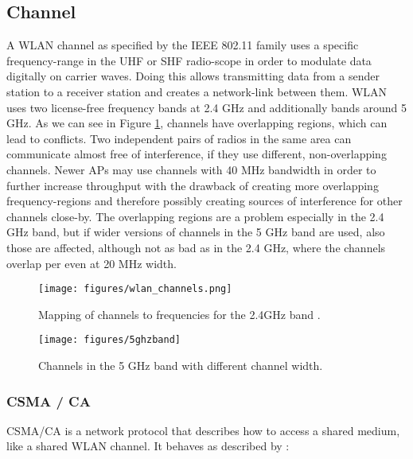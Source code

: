   \subsection{Channel}
    A \ac{WLAN} channel as specified by the IEEE 802.11 family uses a specific frequency-range in the \ac{UHF} or \ac{SHF} radio-scope in order 
    to modulate data digitally on carrier waves.
    Doing this allows transmitting data from a sender station to a receiver station and creates a network-link between them.
    \ac{WLAN} uses two license-free frequency bands at 2.4 GHz and additionally bands around 5 GHz.
    As we can see in Figure \ref{fig:wlan_channels}, channels have overlapping regions, which can lead to conflicts.
    Two independent pairs of radios in the same area can communicate almost free of interference, if they use different, non-overlapping channels.
    Newer APs may use channels with 40 MHz bandwidth in order to further increase throughput with the drawback of creating more overlapping frequency-regions
    and therefore possibly creating sources of interference for other channels close-by.
    The overlapping regions are a problem especially in the 2.4 GHz band, but if wider versions of channels in the 5 GHz band are used, also those are affected,
    although not as bad as in the 2.4 GHz, where the channels overlap per even at 20 MHz width.
    
    \begin{figure}[bh!]
      \centering
      \texttt{[image: figures/wlan\_channels.png]}
      \caption{Mapping of channels to frequencies for the 2.4GHz band \cite{wlan_channels}.}
      \label{fig:wlan_channels}
    \end{figure}
    
    \begin{figure}[bh!]
      \centering
      \texttt{[image: figures/5ghzband]}
      \caption{Channels in the 5 GHz band with different channel width.}
      \label{fig:5ghzband}
    \end{figure}
    
      \subsubsection{CSMA / CA}
	\ac{CSMA/CA} is a network protocol that describes how to access a shared medium, like a shared \ac{WLAN} channel.
	It behaves as described by \cite{csma_techo}:
	
